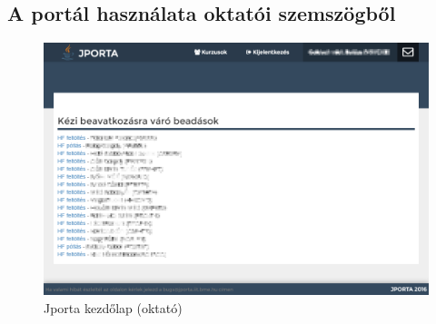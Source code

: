 \subsection{A portál használata oktatói szemszögből}
\begin{figure}[h]
    \centering
    \includegraphics[width=\textwidth]{figures/Jporta-home-o}
    \caption{Jporta kezdőlap (oktató)}
    \label{figure:jporta-home-o}
\end{figure}


